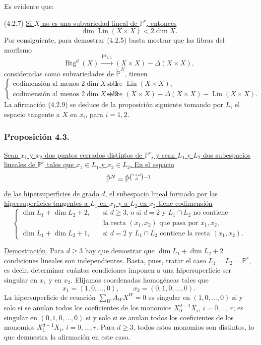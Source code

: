 \pageoriginale

Es evidente que:

\medskip
\noindent(4.2.7) \underline{Si $X$ no es una subvariedad lineal de
$\mathbb P^r$, entonces}
\[
\dim\operatorname{Lin}(X\times X)<2\dim X.
\]
Por consiguiente, para demostrar (4.2.5) basta mostrar que las fibras
del morfismo
\begin{equation}\tag{4.2.8}
\operatorname{Btg}^{d}(X)
\xrightarrow{\ \operatorname{pr}_{2,3}\ }
(X\times X)-\Delta(X\times X),
\end{equation}
consideradas como subvariedades de $\check{\mathbb P}^{N}$, tienen
{\footnotesize\begin{equation}\tag{4.2.9}
\left\{
\begin{array}{ll}
\text{codimensión al menos $2\dim X+1$}
 &\text{sobre $\operatorname{Lin}(X\times X)$},\\[1ex]
\text{codimensión al menos $2\dim X+2$}
 &\text{sobre $(X\times X)-\Delta(X\times X)
                 -\operatorname{Lin}(X\times X)$.}
\end{array}
\right.
\end{equation}}
La afirmación (4.2.9) se deduce de la proposición siguiente tomando
por $L_i$ el espacio tangente a $X$ en $x_i$, para $i=1,2$.

\subsubsection*{Proposición 4.3.}
\underline{Sean $x_1$ y $x_2$ dos puntos cerrados distintos de
$\mathbb P^r$, y sean $L_1$ y $L_2$ dos subespacios lineales de
$\mathbb P^r$ tales que $x_1\in L_1$ y $x_2\in L_2$. En el espacio}
\[
\check{\mathbb P}^{N}
=\check{\mathbb P}^{\binom{r+d}{d}-\sisi{d}{1}}
\]
\underline{de las hipersuperficies de grado $d$, el subespacio lineal
formado por las hipersuperficies tangentes a $L_1$ en $x_1$ y a
$L_2$ en $x_2$ tiene codimensión}
\[
\left\{
\begin{aligned}
\dim L_1+\dim L_2+2,
&\quad\text{si $d\geq3$, o si $d=2$ y $L_1\cap L_2$ no contiene}\\[-0.2ex]
&\quad\text{la recta $(x_1,x_2)$ que pasa por $x_1,x_2$},\\[1ex]
\dim L_1+\dim L_2+1,
&\quad\text{si $d=2$ y $L_1\cap L_2$ contiene la recta $(x_1,x_2)$.}
\end{aligned}
\right.
\]

\pageoriginale

\noindent\underline{Demostración.}
Para $d\geq3$ hay que demostrar que
$\dim L_1+\dim L_2+2$ condiciones lineales son independientes. Basta,
pues, tratar el caso $L_1=L_2=\mathbb P^r$, es decir, determinar
cuántas condiciones imponen a una hipersuperficie ser singular en
$x_1$ y en $x_2$. Elijamos coordenadas homogéneas tales que
\[
x_1=(1,0,\ldots,0),\qquad x_2=(0,1,0,\ldots,0).
\]
La hipersuperficie de ecuación $\sum_WA_WX^W=0$ es singular en
$(1,0,\ldots,0)$ si y solo si se anulan todos los coeficientes de los
monomios $X_0^{d-1}X_i$, $i=0,\ldots,r$; es singular en
$(0,1,0,\ldots,0)$ si y solo si se anulan todos los coeficientes de
los monomios $X_1^{d-1}X_i$, $i=0,\ldots,r$. Para $d\geq3$, todos
estos monomios son distintos, lo que demuestra la afirmación en este
caso.

